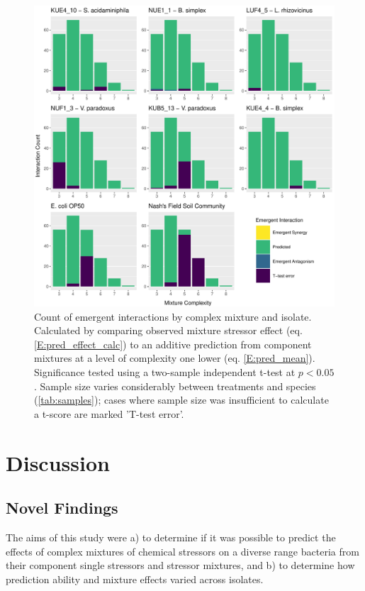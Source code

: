 \documentclass[10pt]{article}
\begin{document}
\begin{figure}[H]
    \centering
    \includegraphics[width = \textwidth]{Scripts/Results/Final_Pipeline/histogram_interaction_emergent.pdf}
    \caption{Count of emergent interactions by complex mixture and isolate. Calculated by comparing observed mixture stressor effect (eq. \ref{E:pred_effect_calc}) to an additive prediction from component mixtures at a level of complexity one lower (eq. \ref{E:pred_mean}). Significance tested using a two-sample independent t-test at $p < 0.05$. Sample size varies considerably between treatments and species (\cref{tab:samples}); cases where sample size was insufficient to calculate a t-score are marked 'T-test error'.}
    \label{fig:histogram_interaction_emergent}
\end{figure}

\newpage
\section{Discussion}
\label{S:4}

\subsection{Novel Findings}
\label{S:4:1}

The aims of this study were a) to determine if it was possible to predict the effects of complex mixtures of chemical stressors on a diverse range bacteria from their component single stressors and stressor mixtures, and b) to determine how prediction ability and mixture effects varied across isolates.
\end{document}

